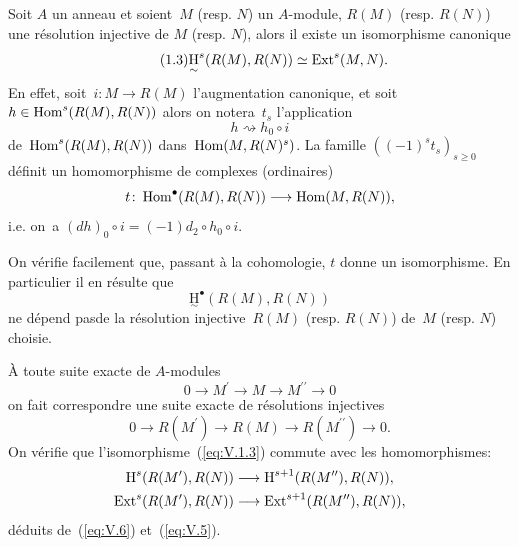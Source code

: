 Soit $A$ un anneau et soient~$M$ (resp. $N$) un $A$-module, $R(M)$ (resp. $R(N)$) une r\'esolution injective de $M$ (resp. $N$), alors il existe un isomorphisme canonique
\begin{equation*} \label{eq:V.1.3} \tag{1.3} \underset{\sim}{\mathrm{H}}^{s}(R(M), R(N))\simeq\operatorname{Ext}^{s}(M, N).
\end{equation*}
En effet, soit~$i\colon M\to R(M)$ l'augmentation canonique, et soit $h\in\operatorname{Hom}^{s}(R(M), R(N))$ alors on notera~$t_{s}$ l'application
$$h\rightsquigarrow h_{0}\circ i$$
de~$\operatorname{Hom}^{s}(R(M), R(N))$ dans~$\operatorname{Hom}(M, R(N)^s)$. La famille $((-1)^{s}t_{s})_{s\geq 0}$ d\'efinit un homomorphisme de complexes (ordinaires)
$$t\colon\Hom^{\bullet}(R(M), R(N))\to\Hom(M, R(N)),
$$
i.e. on~a $(dh)_{0}\circ i=(-1) d_{2}\circ h_{0}\circ i.$

On v\'erifie facilement que, passant \`a la cohomologie, $t$ donne un isomorphisme. En particulier il en r\'esulte que
$$
\underset{\sim}{\mathrm{H}}^{\bullet}(R(M), R(N))$$
ne \og d\'epend pas\fg de la r\'esolution injective~$R(M)$ (resp. $R(N)$) de~$M$ (resp. $N$) choisie.

\`A toute suite exacte de $A$-modules
\begin{equation} \label{eq:V.5} 0\to M^{\prime}\to M\to M^{\prime\prime}\to 0
\end{equation}
on fait correspondre une suite exacte de r\'esolutions injectives
\begin{equation} \label{eq:V.6} 0\to R(M^{\prime})\to R(M)\to R(M^{\prime\prime})\to 0.
\end{equation}
On v\'erifie que l'isomorphisme~(\ref{eq:V.1.3}) commute avec les homomorphismes: \setcounter{equation}{7}
\begin{align} \label{eq:V.8}
\H^{s}(R(M^{\prime}), R(N))&\to \H^{s+1}(R(M^{\prime\prime}), R(N)),\\
\label{eq:V.9} \Ext^{s}(R(M^{\prime}), R(N))&\to\Ext^{s+1}(R(M^{\prime\prime}), R(N)),
\end{align}
d\'eduits de~(\ref{eq:V.6}) et~(\ref{eq:V.5}).

